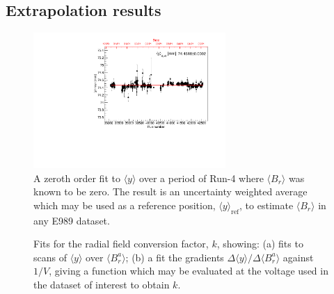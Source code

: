 \subsection{Extrapolation results}\label{subsection:ExtrapolatingTheRadialField}

\begin{figure}[t!]
\centering{}
\includegraphics[trim={0 0 0 0},clip,width=0.65\textwidth]{Images/Chapter4/Fit_NoBadCalos_Run4_2021.pdf}
\caption{A zeroth order fit to $\langle y \rangle$ over a period of Run-4 where $\langle B_{r} \rangle$ was known to be zero. The result is an uncertainty weighted average which may be used as a reference position, $\langle y \rangle_{\text{ref}}$, to estimate $\langle B_{r} \rangle$ in any E989 dataset.}
\label{fig:RefPos}
\end{figure} 
%
\begin{figure}[t!]
\centering{}
{}
\caption{Fits for the radial field conversion factor, $k$, showing: (a) fits to scans of $\langle y \rangle$ over $\langle B_{r}^{a} \rangle$; (b) a fit the gradients $\Delta \langle y \rangle / \Delta \langle B_{r}^{a} \rangle$ against $1/V$, giving a function which may be evaluated at the voltage used in the dataset of interest to obtain $k$.}
\label{fig:EmpiricalConversion}
\end{figure}

